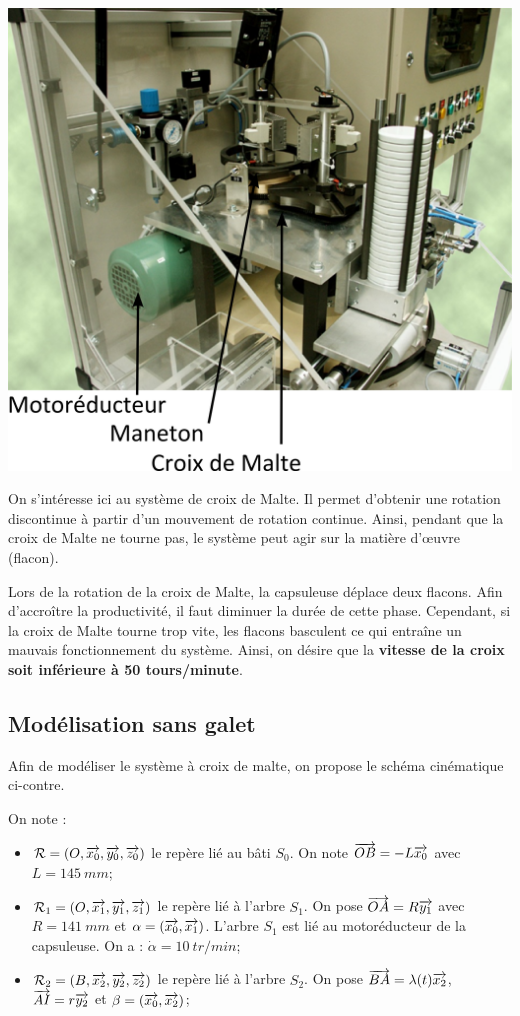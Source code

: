 \documentclass[10pt,fleqn]{article} %
\begin{document}
\begin{multicols}{2}
\begin{center}
 \includegraphics[width=.8\linewidth]{images/systeme3}
\end{center}


On s'intéresse ici au système de croix de Malte. Il permet d'obtenir une rotation discontinue à partir d'un mouvement de rotation continue. Ainsi, pendant que la croix de Malte ne tourne pas, le système peut agir sur la matière d'\oe{}uvre (flacon).

Lors de la rotation de la croix de Malte, la capsuleuse déplace deux flacons. Afin d'accroître la productivité, il faut diminuer la durée de cette phase. Cependant, si la croix de Malte tourne trop vite, les flacons basculent ce qui entraîne un mauvais fonctionnement du système. Ainsi, on désire que la \textbf{vitesse de la croix soit inférieure à 50 tours/minute}. 



\subsection*{Modélisation sans galet}

Afin de modéliser le système à croix de malte, on propose le schéma cinématique ci-contre. 


On note :
\begin{itemize}
\item $\mathcal{R}=\left( O,\overrightarrow{x_0},\overrightarrow{y_0},\overrightarrow{z_0}\right)$ le repère lié au bâti $S_0$. On note $\overrightarrow{OB}=-L\overrightarrow{x_0}$ avec $L = \SI{145}{mm}$;
\item $\mathcal{R}_1=\left( O,\overrightarrow{x_1},\overrightarrow{y_1},\overrightarrow{z_1}\right)$ le repère lié à l'arbre $S_1$. On pose $\overrightarrow{OA}=R\overrightarrow{y_1}$  avec $R =\SI{141}{mm}$ et $\alpha = \left( \overrightarrow{x_0}, \overrightarrow{x_1}\right)$. L'arbre $S_1$ est lié au motoréducteur de la capsuleuse. On a : $\dot{\alpha} = \SI{10}{tr/min}$;
\item  $\mathcal{R}_2=\left( B,\overrightarrow{x_2},\overrightarrow{y_2},\overrightarrow{z_2}\right)$ le repère lié à l'arbre $S_2$. On pose $\overrightarrow{BA}=\lambda(t)\overrightarrow{x_2}$,  $\overrightarrow{AI}=r\overrightarrow{y_2}$ et $\beta = \left( \overrightarrow{x_0}, \overrightarrow{x_2}\right)$;
\end{itemize}



\end{multicols}
\end{document}
